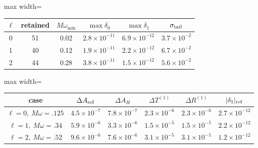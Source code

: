 \documentclass[UTF8,fontset=fandol,11pt,a4paper]{ctexart}
\begin{document}
\par\addvspace{12pt}\noindent\begin{minipage}{\linewidth}
\centering\fontsize{9.5}{12}\selectfont\setlength{\tabcolsep}{3pt}\renewcommand{\arraystretch}{1.18}
\label{audit:tab:numerics}
\begin{adjustbox}{max width=\linewidth}
\begin{tabular}{c c c c c c}
\toprule
$\ell$ & retained & $M\omega_{\min}$ & $\max\delta_0$ & $\max\delta_1$
& $\sigma_{\rm tail}$\\
\midrule
0 & 51 & 0.02 & $2.8\times10^{-11}$ & $6.9\times10^{-12}$ & $3.7\times10^{-2}$\\
1 & 40 & 0.12 & $1.9\times10^{-11}$ & $2.2\times10^{-12}$ & $6.7\times10^{-2}$\\
2 & 44 & 0.28 & $3.8\times10^{-11}$ & $1.5\times10^{-12}$ & $5.6\times10^{-2}$\\
\bottomrule\end{tabular}\end{adjustbox}
\end{minipage}\par\addvspace{9pt}


\par\addvspace{12pt}\noindent\begin{minipage}{\linewidth}
\centering\fontsize{9.5}{12}\selectfont\setlength{\tabcolsep}{3pt}\renewcommand{\arraystretch}{1.18}
\label{audit:tab:production-convergence}
\begin{adjustbox}{max width=\linewidth}
\begin{tabular}{c c c c c c}
\toprule
case & $\Delta A_{\rm ref}$ & $\Delta A_H$
& $\Delta T^{(1)}$ & $\Delta R^{(1)}$ & $|\delta_1|_{\rm ref}$\\
\midrule
$\ell=0,\ M\omega=.125$ & $4.5\times10^{-7}$ & $7.8\times10^{-7}$
& $2.3\times10^{-6}$ & $2.3\times10^{-6}$ & $2.7\times10^{-12}$\\
$\ell=1,\ M\omega=.34$ & $5.9\times10^{-6}$ & $3.3\times10^{-6}$
& $1.5\times10^{-5}$ & $1.5\times10^{-5}$ & $2.2\times10^{-12}$\\
$\ell=2,\ M\omega=.52$ & $9.6\times10^{-6}$ & $7.6\times10^{-6}$
& $3.1\times10^{-5}$ & $3.1\times10^{-5}$ & $1.2\times10^{-12}$\\
\bottomrule\end{tabular}\end{adjustbox}
\end{minipage}\par\addvspace{9pt}
\end{document}
